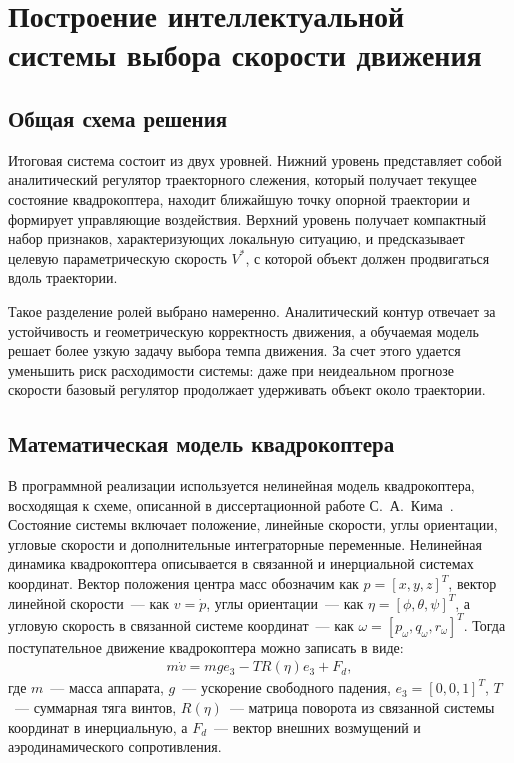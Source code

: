 ﻿\chapter{Построение интеллектуальной системы выбора скорости движения}


\section{Общая схема решения}

Итоговая система состоит из двух уровней.
Нижний уровень представляет собой аналитический регулятор траекторного слежения, который получает текущее состояние квадрокоптера, находит ближайшую точку опорной траектории и формирует управляющие воздействия.
Верхний уровень получает компактный набор признаков, характеризующих локальную ситуацию, и предсказывает целевую параметрическую скорость $V^{\ast}$, с которой объект должен продвигаться вдоль траектории.

Такое разделение ролей выбрано намеренно.
Аналитический контур отвечает за устойчивость и геометрическую корректность движения, а обучаемая модель решает более узкую задачу выбора темпа движения.
За счет этого удается уменьшить риск расходимости системы: даже при неидеальном прогнозе скорости базовый регулятор продолжает удерживать объект около траектории.


\section{Математическая модель квадрокоптера}

В программной реализации используется нелинейная модель квадрокоптера, восходящая к схеме, описанной в диссертационной работе С.~А.~Кима~\cite{kim_algorithms}.
Состояние системы включает положение, линейные скорости, углы ориентации, угловые скорости и дополнительные интеграторные переменные.
Нелинейная динамика квадрокоптера описывается в связанной и инерциальной системах координат.
Вектор положения центра масс обозначим как $p = [x, y, z]^T$, вектор линейной скорости~--- как $v = \dot p$, углы ориентации~--- как $\eta = [\phi, \theta, \psi]^T$, а угловую скорость
в связанной системе координат~--- как $\omega = [p_\omega, q_\omega, r_\omega]^T$.
Тогда поступательное движение квадрокоптера можно записать в виде:
\begin{gather}
    m\dot v = mg e_3 - T R(\eta)e_3 + F_d,
\end{gather}
где $m$~--- масса аппарата, $g$~--- ускорение свободного падения,
$e_3 = [0,0,1]^T$, $T$~--- суммарная тяга винтов, $R(\eta)$~---
матрица поворота из связанной системы координат в инерциальную, а $F_d$~--- вектор внешних возмущений и аэродинамического сопротивления.


